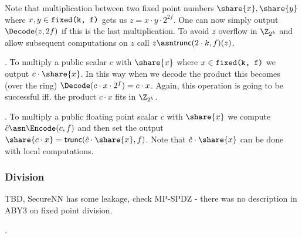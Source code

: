  Note that
multiplication between two fixed point numbers $\share{x}, \share{y}$ where
$x,y \in \verb|fixed(k, f)|$ gets us $z = x \cdot y \cdot 2^{2f}$. One can
now simply output $\Decode(z, 2f)$ if this is the last multiplication.
To avoid $z$ overflow in $\Z_{2^k}$ and allow
subsequent computations on $z$ call $z \asn \mathsf{trunc}(2 \cdot k, f)(z)$.

.
To multiply a public scalar
$c$ with $\share{x}$ where $x \in \verb|fixed(k, f)|$ we output
$c \cdot \share{x}$. In this way when we decode the product
this becomes (over the ring)
$\Decode(c \cdot x \cdot 2^f) = c \cdot x$. Again, this operation is going to
be successful iff. the product $c \cdot x$ fits in $\Z_{2^k}$.

. To multiply a
public floating point scalar $c$ with $\share{x}$ we compute $\hat{c} \asn
\Encode(c, f)$ and then set the output $\share{c \cdot x} =
\mathsf{trunc}(\hat{c} \cdot \share{x}, f)$. Note that $\hat{c} \cdot \share{x}$
can be done with local computations.

\subsubsection{Division}
TBD, SecureNN has some leakage, check MP-SPDZ - there was no description in
ABY3 on fixed point division.

.

